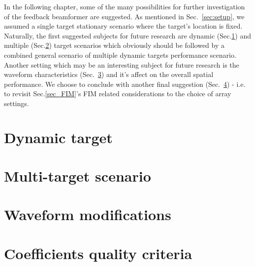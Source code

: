 In the following chapter, some of the many possibilities for further investigation of the feedback beamformer are suggested.
As mentioned in Sec.~\ref{sec:setup}, we assumed a single target stationary scenario where the target's location is fixed.
Naturally, the first suggested subjects for future research are dynamic (Sec.\ref{sec_future_dynamic}) and multiple (Sec.\ref{sec_future_multiTarget}) target scenarios which obviously should be followed by a combined general scenario of multiple dynamic targets performance scenario.
Another setting which may be an interesting subject for future research is the waveform characteristics (Sec.~\ref{sec_future_wavfrom}) and it's affect on the overall spatial performance.
We choose to conclude with another final suggestion (Sec.~\ref{sec_future_coef}) - i.e. to revisit Sec.\ref{sec_FIM}'s FIM related considerations to the choice of array settings. 
\section{Dynamic target}
\label{sec_future_dynamic}

\section{Multi-target scenario}
\label{sec_future_multiTarget}

\section{Waveform modifications}
\label{sec_future_wavfrom}

\section{Coefficients quality criteria}
\label{sec_future_coef}

% 